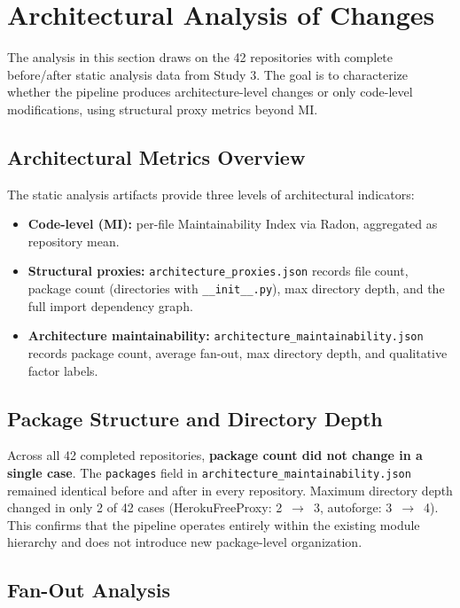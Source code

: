 \section{Architectural Analysis of Changes}
\label{sec:eval_arch_analysis}

The analysis in this section draws on the 42 repositories with complete before/after static analysis data from Study 3. The goal is to characterize whether the pipeline produces architecture-level changes or only code-level modifications, using structural proxy metrics beyond MI.

\subsection{Architectural Metrics Overview}

The static analysis artifacts provide three levels of architectural indicators:

\begin{itemize}
    \item \textbf{Code-level (MI):} per-file Maintainability Index via Radon, aggregated as repository mean.
    \item \textbf{Structural proxies:} \texttt{architecture\_proxies.json} records file count, package count (directories with \texttt{\_\_init\_\_.py}), max directory depth, and the full import dependency graph.
    \item \textbf{Architecture maintainability:} \texttt{architecture\_maintainability.json} records package count, average fan-out, max directory depth, and qualitative factor labels.
\end{itemize}

\subsection{Package Structure and Directory Depth}

Across all 42 completed repositories, \textbf{package count did not change in a single case}. The \texttt{packages} field in \texttt{architecture\_maintainability.json} remained identical before and after in every repository. Maximum directory depth changed in only 2 of 42 cases (HerokuFreeProxy: 2~$\to$~3, autoforge: 3~$\to$~4). This confirms that the pipeline operates entirely within the existing module hierarchy and does not introduce new package-level organization.

\subsection{Fan-Out Analysis}

